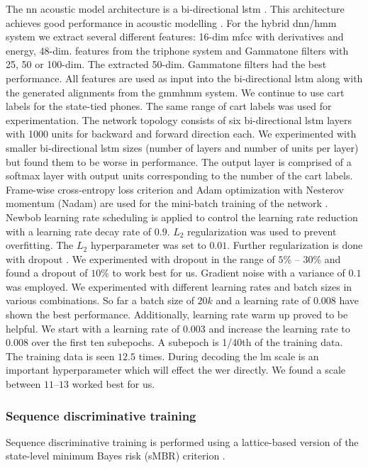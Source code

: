 \documentclass[a4paper]{article}
\begin{document}
The \ac{nn} acoustic model architecture is a bi-directional \ac{lstm} \cite{hochreiter1997:lstm,graves2013hybrid}.
This architecture achieves good performance in acoustic modelling \cite{graves2013hybrid,zeyer17:lstm}.
For the hybrid \ac{dnn}/\ac{hmm} system we extract several different features: 16-dim \ac{mfcc} with derivatives and energy, 48-dim. features from the triphone system and Gammatone filters \cite{schlueter:icassp07} with 25, 50 or 100-dim.
The extracted 50-dim. Gammatone filters had the best performance.
All features are used as input into the bi-directional \ac{lstm} along with the generated alignments from the \ac{gmmhmm} system.
We continue to use \ac{cart} labels for the state-tied phones.
The same range of \ac{cart} labels was used for experimentation.
The network topology consists of six bi-directional \ac{lstm} layers with 1000 units for backward and forward direction each.
We experimented with smaller bi-directional \ac{lstm} sizes (number of layers and number of units per layer) but found them to be worse in performance.
The output layer is comprised of a softmax layer with output units corresponding to the number of the \ac{cart} labels.
Frame-wise cross-entropy loss criterion and Adam optimization with Nesterov momentum (Nadam) are used for the mini-batch training of the network \cite{kingma2014:adam,dozat2016:incorporating}.
Newbob learning rate scheduling \cite{zeyer17:lstm} is applied to control the learning rate reduction with a learning rate decay rate of $0.9$.
$L_2$ regularization was used to prevent overfitting.
The $L_2$ hyperparameter was set to $0.01$.
Further regularization is done with dropout \cite{srivastava2014:dropout}.
We experimented with dropout in the range of $5$\% -- $30$\% and found a dropout of $10$\% to work best for us.
Gradient noise \cite{neelakantan2015:adding} with a variance of $0.1$ was employed.
We experimented with different learning rates and batch sizes in various combinations.
So far a batch size of $20k$ and a learning rate of $0.008$ have shown the best performance.
Additionally, learning rate warm up proved to be helpful.
We start with a learning rate of $0.003$ and increase the learning rate to $0.008$ over the first ten subepochs.
A subepoch is 1/40th of the training data.
The training data is seen $12.5$ times.
During decoding the \ac{lm} scale is an important hyperparameter which will effect the \ac{wer} directly.
We found a scale between $11$--$13$ worked best for us.


\subsubsection{Sequence discriminative training}
\label{sec:seqdisc}
Sequence discriminative training is performed using a lattice-based version of the state-level minimum Bayes risk (sMBR) criterion \cite{mbr}.
\end{document}
